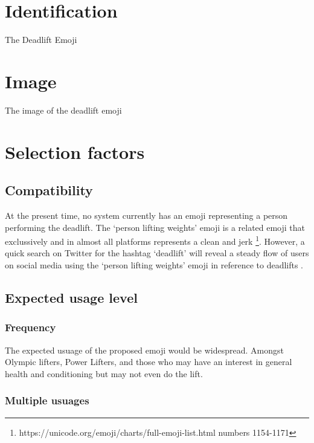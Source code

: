 \documentclass{article}
\begin{document}
\newcommand{\emojiname}{`person deadlifting'}
\begin{abstract}
The intention of this proposal is to advocate for the inclusion of a new emoji, \emojiname{} , as a Unicode emoji character. 
Amongst professional Power Lifters, professional Olympic lifters, and amature lifters the deadlift is a core training lift. 
For Power Lifters, it is one of the three lifts in competition. For Olympic lifters, it is the first phase of all lifts recognised by the International Olympic Commitee
\end{abstract}
\section{Identification}
The Deadlift Emoji

\section{Image}
The image of the deadlift emoji

\section{Selection factors}
\subsection{Compatibility}
At the present time, no system currently has an emoji representing a person performing the deadlift. The `person lifting weights' emoji is a related emoji that
exclussively and in almost all platforms represents a clean and jerk \footnote{https://unicode.org/emoji/charts/full-emoji-list.html numbers 1154-1171}.
However, a quick search on Twitter for the hashtag `deadlift' will reveal a steady flow of users on social media using the `person lifting weights' emoji in reference to deadlifts .

\subsection{Expected usage level}
\subsubsection{Frequency}
The expected usuage of the proposed emoji would be widespread. Amongst Olympic lifters, Power Lifters, and those who may have an interest in general health and conditioning but may not even do the
lift.
\subsubsection{Multiple usuages}
\end{document}
